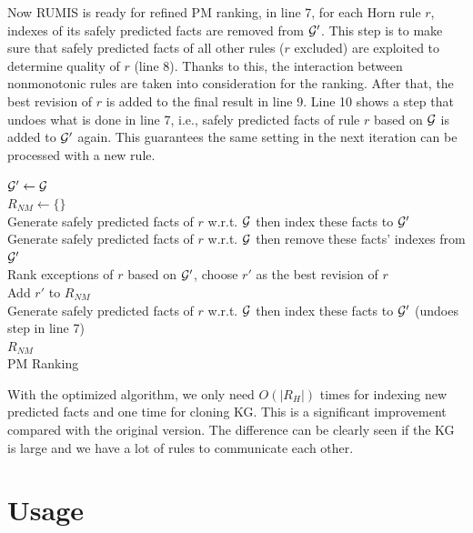 Now RUMIS is ready for refined PM ranking, in line 7, for each Horn rule $r$, indexes of its safely predicted facts are removed from $\mathcal{G}'$. This step is to make sure that safely predicted facts of all other rules ($r$ excluded) are exploited to determine quality of $r$ (line 8). Thanks to this, the interaction between nonmonotonic rules are taken into consideration for the ranking. After that, the best revision of $r$ is added to the final result in line 9. Line 10 shows a step that undoes what is done in line 7, i.e., safely predicted facts of rule $r$ based on $\mathcal{G}$ is added to $\mathcal{G}'$ again. This guarantees the same setting in the next iteration can be processed with a new rule.

\IncMargin{1.5em}
\begin{algorithm}[H]
\DontPrintSemicolon
\SetAlgoLined
{}
\BlankLine
$\mathcal{G}' \leftarrow \mathcal{G}$\\
$R_{NM} \leftarrow \{\}$\\
\BlankLine
{} {
	Generate safely predicted facts of $r$ w.r.t. $\mathcal{G}$ then index these facts to $\mathcal{G}'$\\
}
\BlankLine
{} {
	Generate safely predicted facts of $r$ w.r.t. $\mathcal{G}$ then remove these facts' indexes from $\mathcal{G}'$\\
	Rank exceptions of $r$ based on $\mathcal{G}'$, choose $r'$ as the best revision of $r$\\
	Add $r'$ to $R_{NM}$\\
	Generate safely predicted facts of $r$ w.r.t. $\mathcal{G}$ then index these facts to $\mathcal{G}'$ (undoes step in line 7)\\
}
\Return $R_{NM}$\\
\caption{PM Ranking}
\label{pm_ranking_algo}
\end{algorithm}
\DecMargin{1.5em}

With the optimized algorithm, we only need $O(|R_H|)$ times for indexing new predicted facts and one time for cloning KG. This is a significant improvement compared with the original version. The difference can be clearly seen if the KG is large and we have a lot of rules to communicate each other.

\section{Usage}

